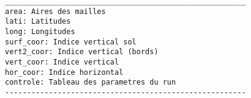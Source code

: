 {\footnotesize
\begin{verbatim}
_______________________________________________________
area: Aires des mailles
lati: Latitudes
long: Longitudes
surf_coor: Indice vertical sol
vert2_coor: Indice vertical (bords)
vert_coor: Indice vertical
hor_coor: Indice horizontal
controle: Tableau des parametres du run
-------------------------------------------------------
\end{verbatim}
}
